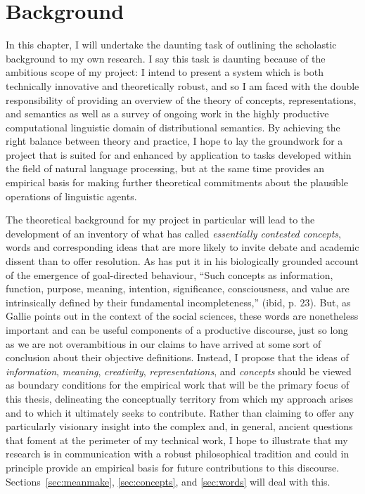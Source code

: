\chapter{Background} \label{chap:background}
In this chapter, I will undertake the daunting task of outlining the scholastic background to my own research.  I say this task is daunting because of the ambitious scope of my project: I intend to present a system which is both technically innovative and theoretically robust, and so I am faced with the double responsibility of providing an overview of the theory of concepts, representations, and semantics as well as a survey of ongoing work in the highly productive computational linguistic domain of distributional semantics.  By achieving the right balance between theory and practice, I hope to lay the groundwork for a project that is suited for and enhanced by application to tasks developed within the field of natural language processing, but at the same time provides an empirical basis for making further theoretical commitments about the plausible operations of linguistic agents.

The theoretical background for my project in particular will lead to the development of an inventory of what \cite{Gallie1956} has called \emph{essentially contested concepts}, words and corresponding ideas that are more likely to invite debate and academic dissent than to offer resolution.  As \cite{Deacon2011} has put it in his biologically grounded account of the emergence of goal-directed behaviour, ``Such concepts as information, function, purpose, meaning, intention, significance, consciousness, and value are intrinsically defined by their fundamental incompleteness,'' (ibid, p. 23).  But, as Gallie points out in the context of the social sciences, these words are nonetheless important and can be useful components of a productive discourse, just so long as we are not overambitious in our claims to have arrived at some sort of conclusion about their objective definitions.  Instead, I propose that the ideas of \emph{information}, \emph{meaning}, \emph{creativity}, \emph{representations}, and \emph{concepts} should be viewed as boundary conditions for the empirical work that will be the primary focus of this thesis, delineating the conceptually territory from which my approach arises and to which it ultimately seeks to contribute.  Rather than claiming to offer any particularly visionary insight into the complex and, in general, ancient questions that foment at the perimeter of my technical work, I hope to illustrate that my research is in communication with a robust philosophical tradition and could in principle provide an empirical basis for future contributions to this discourse.  Sections~\ref{sec:meanmake}, \ref{sec:concepts}, and \ref{sec:words} will deal with this.

